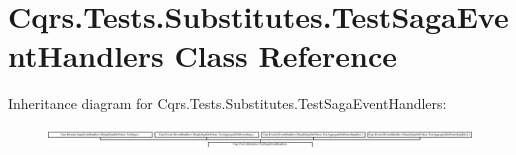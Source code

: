\hypertarget{classCqrs_1_1Tests_1_1Substitutes_1_1TestSagaEventHandlers}{}\section{Cqrs.\+Tests.\+Substitutes.\+Test\+Saga\+Event\+Handlers Class Reference}
\label{classCqrs_1_1Tests_1_1Substitutes_1_1TestSagaEventHandlers}
Inheritance diagram for Cqrs.\+Tests.\+Substitutes.\+Test\+Saga\+Event\+Handlers\+:\begin{figure}[H]
\begin{center}
\leavevmode
\includegraphics[height=0.550098cm]{classCqrs_1_1Tests_1_1Substitutes_1_1TestSagaEventHandlers}
\end{center}
\end{figure}
